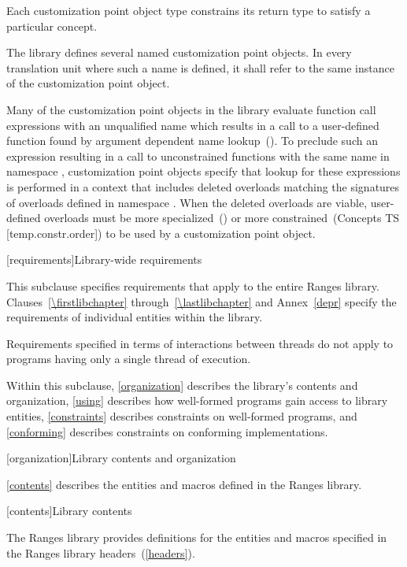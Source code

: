 \pnum
Each customization point object type constrains its return type
to satisfy a particular concept.

\pnum
The library defines several named customization point objects.
In every translation unit where such a name is defined, it shall
refer to the same instance of the customization point object.

\pnum
\enternote Many of the customization point objects in the library
evaluate function call expressions with an unqualified name which
results in a call to a user-defined function found by argument
dependent name lookup~(). To preclude
such an expression resulting in a call to unconstrained functions
with the same name in namespace , customization point
objects specify that lookup for these expressions is performed in
a context that includes deleted overloads matching the signatures
of overloads defined in namespace . When the deleted
overloads are viable, user-defined overloads must be more
specialized~() or more
constrained~(Concepts TS [temp.constr.order]) to be used by a
customization point object. \exitnote

[requirements]{Library-wide requirements}

\pnum
This subclause specifies requirements that apply to the entire Ranges library.
Clauses~\ref{\firstlibchapter} through~\ref{\lastlibchapter} and Annex~\ref{depr}
specify the requirements of individual entities within the library.

\pnum
Requirements specified in terms of interactions between threads do not apply to
programs having only a single thread of execution.

\pnum
Within this subclause, \ref{organization} describes the library's contents and
organization, \ref{using} describes how well-formed \Cpp programs gain access to
library entities, \ref{constraints} describes constraints on well-formed \Cpp
programs, and \ref{conforming} describes constraints on conforming
implementations.

[organization]{Library contents and organization}

\pnum
\ref{contents} describes the entities and macros defined in the Ranges library.

[contents]{Library contents}

\pnum
The Ranges library provides definitions for the entities and macros specified in
the Ranges library headers~(\ref{headers}).

